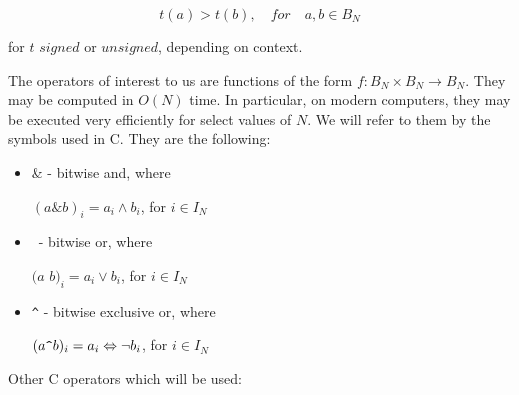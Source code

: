 \documentclass{article}
\begin{document}
\begin{equation*}t(a)>t(b), \quad for \quad a,b \in B_N\end{equation*}

for $t$ $signed$ or $unsigned$, depending on context.
\vspace{10pt}

The operators of interest to us are functions of the form 
$f : B_N \times B_N \rightarrow B_N$. 
They may be computed in $O(N)$ time. In particular, on modern 
computers, they may be executed very efficiently for select values of $N$.
We will refer to them by the symbols used in C. They are the 
following:
\begin{itemize}
\item \& - bitwise and, where

$(a \& b)_i = a_i \wedge b_i$, for $i \in I_N$
\item \textbar \,  - bitwise or, where

$(a$ \textbar $b)_i = a_i \vee b_i$, for $i \in I_N$
\item \verb!^!  - bitwise exclusive or, where

$(a \verb!^! b)_i = a_i \Leftrightarrow \neg b_i$, for $i \in I_N$
\end{itemize}

Other C operators which will be used:
\end{document}

